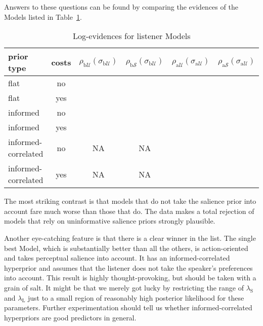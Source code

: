Answers to these questions can be found by comparing the evidences of
the Models listed in Table~\ref{table:listener mod}.
%
\begin{table}[htb] 
\caption{Log-evidences for listener Models}
  \centering 
  \begin{tabular}{lccccc}
    prior type & costs &
    $\rho_{\mathrm{b}\mathcal{U}}(\sigma_{\mathrm{b}\mathcal{U}})$ 
    & $\rho_{\mathrm{b}\mathcal{S}}(\sigma_{\mathrm{b}\mathcal{U}})$
    & $\rho_{\mathrm{a}\mathcal{U}}(\sigma_{\mathrm{a}\mathcal{U}})$
    & $\rho_{\mathrm{a}\mathcal{S}}(\sigma_{\mathrm{a}\mathcal{U}})$
    \\ \midrule
    flat
    & no
    & \cellcolor{lightgray!76}{-24.83}
    & \cellcolor{lightgray!94}{-11.66} 
    & \cellcolor{lightgray!77}{-24.06} 
    & \cellcolor{lightgray!75}{-10.62} 
    \\ 
    flat
    & yes
    & \cellcolor{lightgray!76}{-24.80} 
    & \cellcolor{lightgray!96}{-9.84}
    & \cellcolor{lightgray!77}{-23.84}
    & \cellcolor{lightgray!95}{-10.81}
    \\ \addlinespace[0.1cm]
    informed
    & no
    & \cellcolor{lightgray!30}{-59.87} 
    & \cellcolor{lightgray!95}{-10.44}
    & \cellcolor{lightgray!75}{-25.42}
    & \cellcolor{lightgray!98}{-8.48}
    \\
    informed
    & yes
    & \cellcolor{lightgray!18}{-68.43}
    & \cellcolor{lightgray!91}{-13.35}
    & \cellcolor{lightgray!77}{-24.21}
    & \cellcolor{lightgray!93}{-11.85}
    \\ \addlinespace[0.1cm]
    informed-correlated
    & no
    & NA
    & NA
    & \cellcolor{lightgray!23}{-64.70} 
    & \cellcolor{lightgray!100}{-6.80}
    \\
    informed-correlated
    & yes
    & NA
    & NA
    & \cellcolor{lightgray!0}{-82.36} 
    & \cellcolor{lightgray!71}{-29.01}
    \\
  \end{tabular}
  \label{table:listener mod}
\end{table}

The most striking contrast is that models that do not take the
salience prior into account fare much worse than those that do. The
data makes a total rejection of models that rely on uninformative
salience priors strongly plausible.

Another eye-catching feature is that there is a clear winner in the
list. The single best Model, which is substantially better than all
the others, is action-oriented and takes perceptual salience into
account. It has an informed-correlated hyperprior and assumes that the
listener does not take the speaker's preferences into account. This
result is highly thought-provoking, but should be taken with a grain
of salt. It might be that we merely got lucky by restricting the range
of $\lambda_\mathrm{S}$ and $\lambda_\mathrm{L}$ just to a small
region of reasonably high posterior likelihood for these
parameters. Further experimentation should tell us whether
informed-correlated hyperpriors are good predictors in general.

